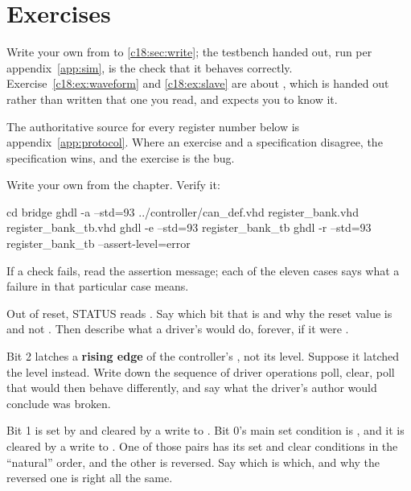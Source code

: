 
\section{Exercises}
\label{c18:sec:exercises}

\begin{aside}
Write your own  from  to \ref{c18:sec:write}; the
testbench handed out, run per appendix~\ref{app:sim}, is the check that it behaves correctly.
Exercise~\ref{c18:ex:waveform} and \ref{c18:ex:slave} are about , which is handed
out rather than written \textemdash{} that one you read, and  expects you to know it.

The authoritative source for every register number below is appendix~\ref{app:protocol}. Where an
exercise and a specification disagree, the specification wins, and the exercise is the bug.
\end{aside}

\label{c18:ex:bank}
Write your own  from the chapter. Verify it:

\begin{shell}
cd bridge
ghdl -a --std=93 ../controller/can_def.vhd register_bank.vhd register_bank_tb.vhd
ghdl -e --std=93 register_bank_tb
ghdl -r --std=93 register_bank_tb --assert-level=error
\end{shell}

If a check fails, read the assertion message; each of the eleven cases says what a failure in that
particular case means.

\label{c18:ex:status}
 Out of reset, STATUS reads . Say which bit that is and why the reset value
is  and not . Then describe what a driver's  would do, forever, if it
were .

 Bit 2 latches a \textbf{rising edge} of the controller's , not its level.
Suppose it latched the level instead. Write down the sequence of driver operations \textemdash{} poll,
clear, poll \textemdash{} that would then behave differently, and say what the driver's author would
conclude was broken.

 Bit 1 is set by  and cleared by a write to . Bit 0's main set
condition is , and it is cleared by a write to . One of those pairs has
its set and clear conditions in the ``natural'' order, and the other is reversed. Say which is which,
and why the reversed one is right all the same.

